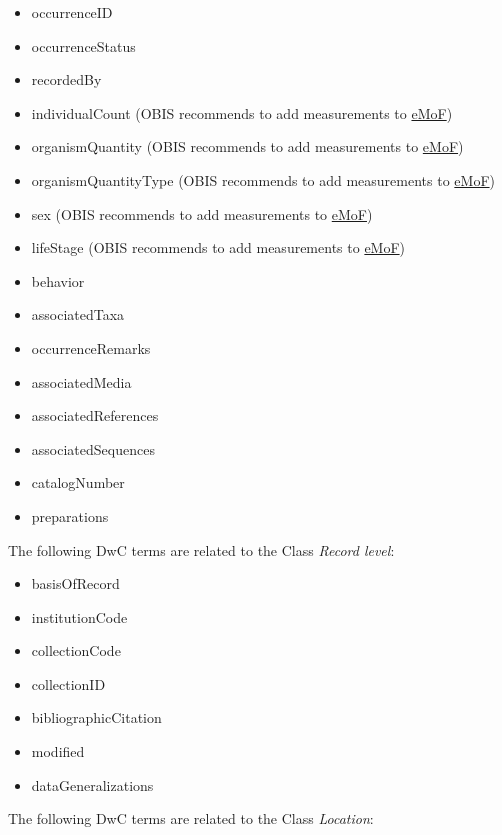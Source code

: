 \documentclass[
  letterpaper,
  DIV=11,
  numbers=noendperiod,
  oneside]{scrreprt}
\providecommand{\tightlist}{%
  \setlength{\itemsep}{0pt}\setlength{\parskip}{0pt}}\usepackage{longtable,booktabs,array}
\begin{document}
\begin{itemize}
\tightlist
\item
  occurrenceID
\item
  occurrenceStatus
\item
  recordedBy
\item
  individualCount (OBIS recommends to add measurements to
  \protect\hyperlink{extendedmeasurementorfact-extension-emof}{eMoF})
\item
  organismQuantity (OBIS recommends to add measurements to
  \protect\hyperlink{extendedmeasurementorfact-extension-emof}{eMoF})
\item
  organismQuantityType (OBIS recommends to add measurements to
  \protect\hyperlink{extendedmeasurementorfact-extension-emof}{eMoF})
\item
  sex (OBIS recommends to add measurements to
  \protect\hyperlink{extendedmeasurementorfact-extension-emof}{eMoF})
\item
  lifeStage (OBIS recommends to add measurements to
  \protect\hyperlink{extendedmeasurementorfact-extension-emof}{eMoF})
\item
  behavior
\item
  associatedTaxa
\item
  occurrenceRemarks
\item
  associatedMedia
\item
  associatedReferences
\item
  associatedSequences
\item
  catalogNumber
\item
  preparations
\end{itemize}

The following DwC terms are related to the Class \emph{Record level}:

\begin{itemize}
\tightlist
\item
  basisOfRecord
\item
  institutionCode
\item
  collectionCode
\item
  collectionID
\item
  bibliographicCitation
\item
  modified
\item
  dataGeneralizations
\end{itemize}

The following DwC terms are related to the Class \emph{Location}:
\end{document}
